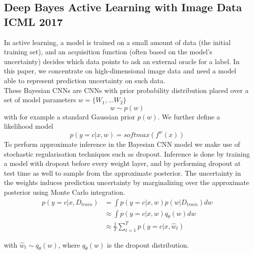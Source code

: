 \documentclass{article}
\begin{document}
\subsection{Deep Bayes Active Learning with Image Data ICML 2017}
In active learning, a model is trained on a small amount of data (the initial training set), and an acquisition function (often based on the model's uncertainty) decides which data points to ask an external oracle for a label. In this paper, we concentrate on high-dimensional image data and need a model able to represent prediction uncertainty on such data.\\

\noindent These Bayesian CNNs are CNNs with prior probability distribution placed over a set of model parameters $w=\{W_1,...W_2\}$
\[w\sim p(w)\]
with for example a standard Gaussian prior $p(w)$. We further define a likelihood model
\[p(y=c|x,w)=softmax(f^w(x))\]
To perform approximate inference in the Bayesian CNN model we make use of stochastic regularisation techniques such as dropout. Inference is done by training a model with dropout before every weight layer, and by performing dropout at test time as well to sample from the approximate posterior. The uncertainty in the weights induces prediction uncertainty by marginalizing over the approximate posterior using Monte Carlo integration.
\begin{align*}
p(y=c|x,D_{train}) &=\int p(y=c|x,w)p(w|D_{train})dw\\
& \approx \int p(y=c|x,w)q_\theta(w)dw\\
& \approx \frac{1}{T}\sum_{t=1}^{T}p(y=c|x,\hat{w}_t)
\end{align*}

\noindent with $\hat{w}_t\sim q_\theta(w)$, where $q_\theta(w)$ is the dropout distribution.\\
\end{document}
